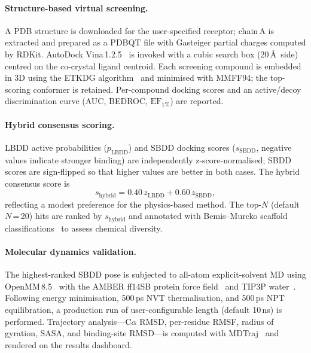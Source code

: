 \documentclass[12pt,a4paper]{article}
\begin{document}
\paragraph{Structure-based virtual screening.}
A PDB structure is downloaded for the user-specified receptor; chain\,A is
extracted and prepared as a PDBQT file with Gasteiger partial charges
computed by RDKit.  AutoDock Vina\,1.2.5~\cite{eberhardt2021autodock} is
invoked with a cubic search box ($20$\,\AA\ side) centred on the
co-crystal ligand centroid.  Each screening compound is embedded in 3D
using the ETKDG algorithm~\cite{riniker2015better} and minimised with
MMFF94; the top-scoring conformer is retained.  Per-compound docking scores
and an active/decoy discrimination curve (AUC, BEDROC, $\text{EF}_{1\%}$)
are reported.

\paragraph{Hybrid consensus scoring.}
LBDD active probabilities ($p_\mathrm{LBDD}$) and SBDD docking scores
($s_\mathrm{SBDD}$, negative values indicate stronger binding) are
independently z-score-normalised; SBDD scores are sign-flipped so that
higher values are better in both cases.  The hybrid consensus score is
\begin{equation}
  s_\mathrm{hybrid} = 0.40\,z_\mathrm{LBDD} + 0.60\,z_\mathrm{SBDD},
  \label{eq:hybrid}
\end{equation}
reflecting a modest preference for the physics-based method.  The top-$N$
(default $N$\,=\,20) hits are ranked by $s_\mathrm{hybrid}$ and annotated
with Bemis--Murcko scaffold classifications~\cite{bemis1996properties} to
assess chemical diversity.

\paragraph{Molecular dynamics validation.}
The highest-ranked SBDD pose is subjected to all-atom explicit-solvent MD
using OpenMM\,8.5~\cite{eastman2024openmm8} with the AMBER ff14SB protein
force field~\cite{maier2015ff14sb} and TIP3P water~\cite{jorgensen1983comparison}.
Following energy minimisation, 500\,ps NVT thermalisation, and 500\,ps NPT
equilibration, a production run of user-configurable length (default 10\,ns)
is performed.  Trajectory analysis—C$\alpha$ RMSD, per-residue RMSF,
radius of gyration, SASA, and binding-site RMSD—is computed with
MDTraj~\cite{mcgibbon2015mdtraj} and rendered on the results dashboard.
\end{document}
